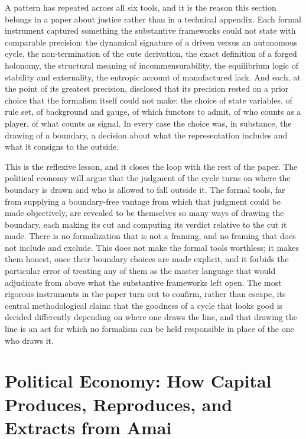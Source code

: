A pattern has repeated across all six tools, and it is the reason this section belongs in a paper about justice rather than in a technical appendix. Each formal instrument captured something the substantive frameworks could not state with comparable precision: the dynamical signature of a driven versus an autonomous cycle, the non-termination of the cute derivation, the exact definition of a forged holonomy, the structural meaning of incommensurability, the equilibrium logic of stability and externality, the entropic account of manufactured lack. And each, at the point of its greatest precision, disclosed that its precision rested on a prior choice that the formalism itself could not make: the choice of state variables, of rule set, of background and gauge, of which functors to admit, of who counts as a player, of what counts as signal. In every case the choice was, in substance, the drawing of a boundary, a decision about what the representation includes and what it consigns to the outside.

This is the reflexive lesson, and it closes the loop with the rest of the paper. The political economy will argue that the judgment of the cycle turns on where the boundary is drawn and who is allowed to fall outside it. The formal tools, far from supplying a boundary-free vantage from which that judgment could be made objectively, are revealed to be themselves so many ways of drawing the boundary, each making its cut and computing its verdict relative to the cut it made. There is no formalization that is not a framing, and no framing that does not include and exclude. This does not make the formal tools worthless; it makes them honest, once their boundary choices are made explicit, and it forbids the particular error of treating any of them as the master language that would adjudicate from above what the substantive frameworks left open. The most rigorous instruments in the paper turn out to confirm, rather than escape, its central methodological claim: that the goodness of a cycle that looks good is decided differently depending on where one draws the line, and that drawing the line is an act for which no formalism can be held responsible in place of the one who draws it.

\section{Political Economy: How Capital Produces, Reproduces, and Extracts from Amai}

